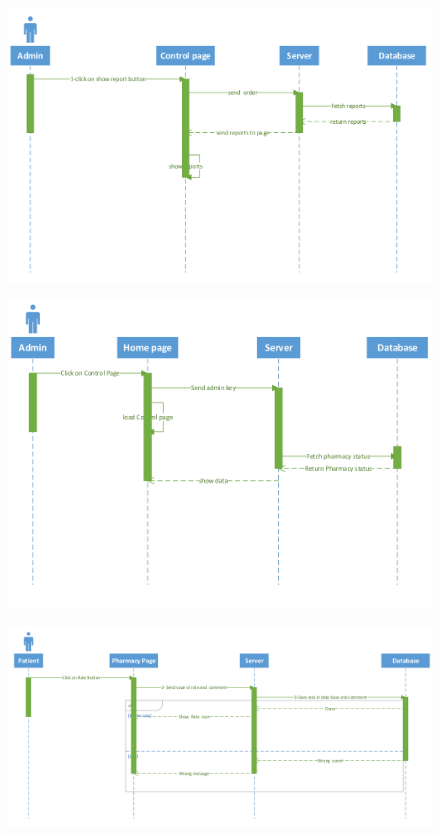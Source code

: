 \documentclass[]{article}
\begin{document}
\begin{figure}[H]
\centering
\includegraphics[scale=0.3]{./sequence/07}
\end{figure}
\begin{figure}[H]
\centering
\includegraphics[scale=0.3]{./sequence/08}
\end{figure}
\begin{figure}[H]
\centering
\includegraphics[scale=0.3]{./sequence/09}
\end{figure}
\end{document}
